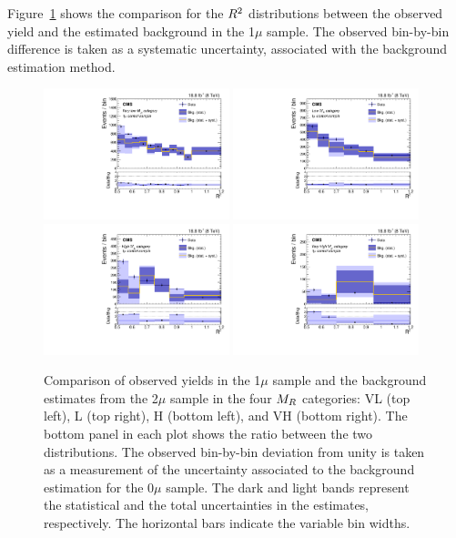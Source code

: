 Figure~\ref{fig:1muCLOSURE} shows the comparison for the
$R^2$ distributions between the observed yield and the
estimated background in the 1$\mu$ sample. The observed bin-by-bin difference is taken as a
systematic uncertainty, associated with the background estimation method.

\begin{figure}
 \centering
   \includegraphics[width=0.48\textwidth]{PredPlotsAN_1MU_LE/OneMu_sys_cat_1.pdf}
   \includegraphics[width=0.48\textwidth]{PredPlotsAN_1MU_LE/OneMu_sys_cat_2.pdf}
   \includegraphics[width=0.48\textwidth]{PredPlotsAN_1MU_LE/OneMu_sys_cat_3.pdf}
   \includegraphics[width=0.48\textwidth]{PredPlotsAN_1MU_LE/OneMu_sys_cat_4.pdf}
 \caption{Comparison of observed yields in the 1$\mu$ sample and the
   background estimates from the 2$\mu$ sample in the four $M_R$ categories:
   VL (top left), L (top right), H (bottom left), and VH (bottom right). The bottom panel in each plot shows the
   ratio between the two distributions. The observed bin-by-bin
   deviation from unity is taken as a measurement of the uncertainty
   associated to the background estimation for the 0$\mu$ sample. The
   dark and light bands represent the statistical and the total
   uncertainties in the estimates, respectively. The horizontal bars indicate
the variable bin widths.\label{fig:1muCLOSURE}}
\end{figure}

